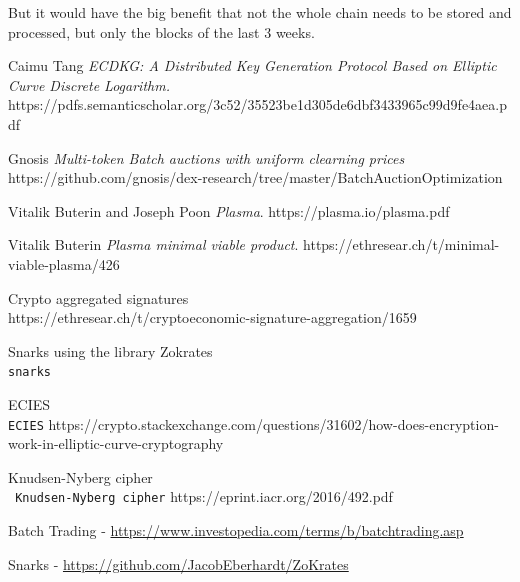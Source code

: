 \documentclass[11pt,parskip=full]{scrartcl}%
\begin{document}
But it would have the big benefit that not the whole chain needs to be stored and processed, but only the blocks of the last 3 weeks. 

\begin{thebibliography}{9}
Caimu Tang
\textit{ECDKG: A Distributed Key Generation Protocol Based on Elliptic
Curve Discrete Logarithm.}  
https://pdfs.semanticscholar.org/3c52/35523be1d305de6dbf3433965c99d9fe4aea.pdf
 

Gnosis
\textit{Multi-token Batch auctions with uniform clearning prices}  
https://github.com/gnosis/dex-research/tree/master/BatchAuctionOptimization

Vitalik Buterin and Joseph Poon
\textit{Plasma}.
https://plasma.io/plasma.pdf

Vitalik Buterin
\textit{Plasma minimal viable product}.
https://ethresear.ch/t/minimal-viable-plasma/426
 
Crypto aggregated signatures
\\\texttt{}
https://ethresear.ch/t/cryptoeconomic-signature-aggregation/1659

Snarks using the library Zokrates
\\\texttt{snarks}

ECIES
\\\texttt{ECIES}
https://crypto.stackexchange.com/questions/31602/how-does-encryption-work-in-elliptic-curve-cryptography

Knudsen-Nyberg cipher
\\\texttt{ Knudsen-Nyberg cipher}
https://eprint.iacr.org/2016/492.pdf


Batch Trading - \href{https://www.investopedia.com/terms/b/batchtrading.asp}{https://www.investopedia.com/terms/b/batchtrading.asp}

 Snarks - \href{https://github.com/JacobEberhardt/ZoKrates}{https://github.com/JacobEberhardt/ZoKrates}

\end{thebibliography}
\end{document}
